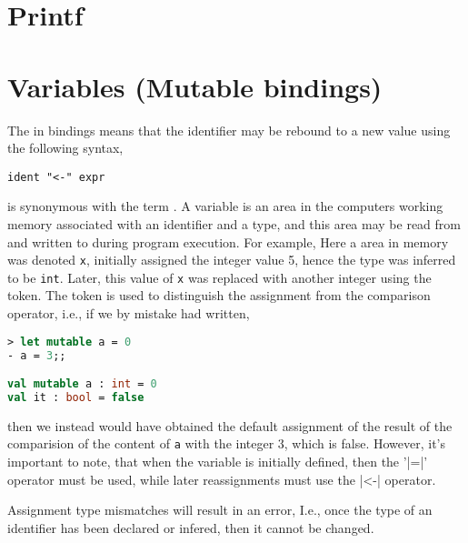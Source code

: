\section{Printf}
\label{sec:printf}

\section{Variables (Mutable bindings)}
\label{sec:mutableValues}
The  in  bindings means that the identifier may be rebound to a new value using the following syntax,
%
\begin{lstlisting}[language=EBNF]
ident "<-" expr
\end{lstlisting}
 is synonymous with the term . A variable is an area in the computers working memory associated with an identifier and a type, and this area may be read from and written to during program execution. For example,
%
%
Here a area in memory was denoted \texttt{x}, initially assigned the integer value 5, hence the type was inferred to be \lstinline|int|.  Later, this value of \texttt{x} was replaced with another integer using the \idx{\token{<-}} token. The \token{<-} token is used to distinguish the assignment from the comparison operator, i.e., if we by mistake had written,
%
\begin{lstlisting}[language=fsharp,caption={fsharpi, example of changing the content of a variable.}]
> let mutable a = 0
- a = 3;;

val mutable a : int = 0
val it : bool = false
\end{lstlisting}
%
then we instead would have obtained the default assignment of the result of the comparision of the content of \lstinline|a| with the integer 3, which is false. However, it's important to note, that when the variable is initially defined, then the '\token|=|' operator must be used, while later reassignments must use the \token|<-|  operator. 

Assignment type mismatches will result in an error, 
%
%
I.e., once the type of an identifier has been declared or infered, then it cannot be changed.

